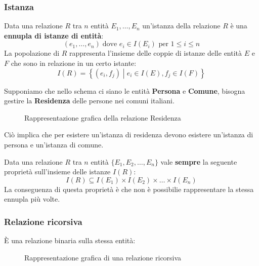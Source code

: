 \documentclass[a4paper]{article}
\begin{document}
\subsubsection{Istanza}
Data una relazione \( R \) tra \( n \) entità \( E_1, \ldots, E_n \) un'istanza della
relazione \( R \) è una \textbf{ennupla di istanze di entità}:
\[
  (e_1, \ldots, e_n) \; \text{dove } e_i \in I(E_i) \text{ per } 1 \le i \le n
\] 
La popolazione di \( R \) rappresenta l'insieme delle coppie di istanze delle entità
\( E \) e \( F \) che sono in relazione in un certo istante:
\[
  I(R) = \left\{ (e_i, f_j) \;\left|\; e_i \in I(E), f_j \in I(F) \right.\right\} 
\]
\begin{example}
  Supponiamo che nello schema ci siano le entità \textbf{Persona} e \textbf{Comune},
  bisogna gestire la \textbf{Residenza} delle persone nei comuni italiani.

  \begin{figure}[H]
    \centering
    \caption{Rappresentazione grafica della relazione Residenza}
  \end{figure}
  \noindent
  Ciò implica che per esistere un'istanza di residenza devono esistere un'istanza
  di persona e un'istanza di comune.
\end{example}
Data una relazione \( R \) tra \( n \) entità \( \{E_1, E_2, \ldots, E_n\} \)
vale \textbf{sempre} la seguente proprietà sull'insieme delle istanze \( I(R) \):
\[
  I(R) \subseteq I(E_1) \times I(E_2) \times \ldots \times I(E_n)
\] 
La conseguenza di questa proprietà è che non è possibilie rappresentare la stessa ennupla
più volte.

\subsubsection{Relazione ricorsiva}
È una relazione binaria sulla stessa entità:
\begin{figure}[H]
  \centering
  \caption{Rappresentazione grafica di una relazione ricorsiva}
\end{figure}
\end{document}
